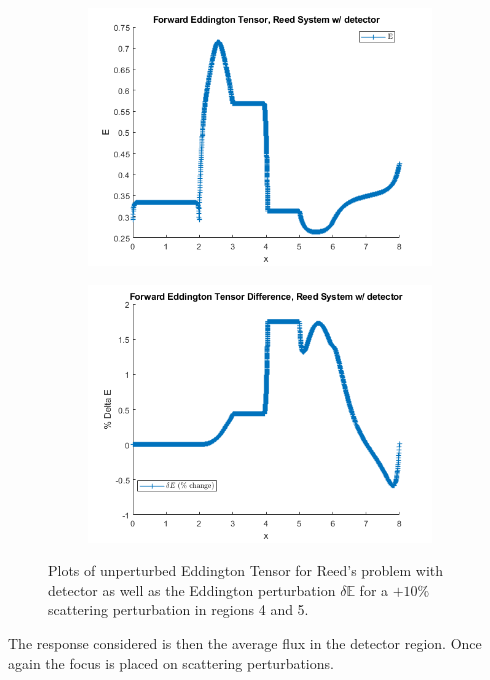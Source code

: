 \documentclass[12pt]{report}
\newcommand{\Edd}{\mathbb{E}}
\begin{document}
\begin{figure}[H]
\centering
\begin{subfigure}{.5\textwidth}
  \centering
  \includegraphics[width=.98\linewidth]{figures2/775E.png}
\end{subfigure}%
\begin{subfigure}{.5\textwidth}
  \centering
  \includegraphics[width=.98\linewidth]{figures2/775deltaE.png}
\end{subfigure}
\caption{Plots of unperturbed Eddington Tensor for Reed's problem with detector as well as the Eddington perturbation $\delta \Edd$ for a $+10 \%$ scattering perturbation in regions 4 and 5.}
\label{fig:Edd6}
\end{figure}
The response considered is then the average flux in the detector region. Once again the focus is placed on scattering perturbations.
\end{document}
